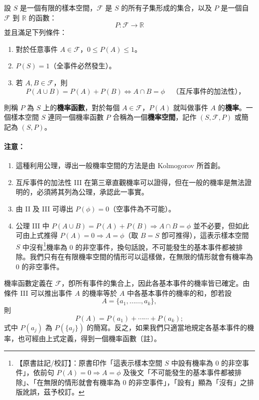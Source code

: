 \medskip
\begin{definition*}
設 $S$ 是一個有限的樣本空間，$\mathscr{F}$ 是 $S$ 的所有子集形成的集合，以及 $P$ 是一個自 $\mathscr{F}$ 到 $\mathbb{R}$ 的函數：
\[
P \colon \mathscr{F} \longrightarrow \mathbb{R}
\]
並且滿足下列條件：
\begin{enumerate}[label=\Roman*., itemsep=2pt, topsep=2pt]
  \item 對於任意事件 $A \in \mathscr{F}$，$0 \le P(A) \le 1$。
  \item $P(S) = 1$（全事件必然發生）。
  \item 若 $A, B \in \mathscr{F}$，則
  \[
  P(A \cup B) = P(A) + P(B) \Longleftrightarrow A \cap B = \phi \quad \text{（互斥事件的加法性），}
  \]
\end{enumerate}
則稱 $P$ 為 $S$ 上的\textbf{機率函數}，對於每個 $A \in \mathscr{F}$，$P(A)$ 就叫做事件 $A$ 的\textbf{機率}。一個樣本空間 $S$ 連同一個機率函數 $P$ 合稱為一個\textbf{機率空間}，記作 $(S, \mathscr{F}, P)$ 或簡記為 $(S, P)$。
\end{definition*}

\medskip
\paragraph{注意：}
\begin{enumerate}[label=\arabic*., leftmargin=2em, itemsep=0.3em]
  \item 這種利用公理，導出一般機率空間的方法是由 Kolmogorov 所首創。
  \item 互斥事件的加法性 III 在第三章直觀機率可以證得，但在一般的機率是無法證明的，必須將其列為公理，承認此一事實。
  \item 由 II 及 III 可導出 $P(\phi) = 0$（空事件為不可能）。
  \item 公理 III 中 $P(A \cup B) = P(A) + P(B) \Longrightarrow A \cap B = \phi$ 並不必要，但如此可由上式推得 $P(A) = 0 \Longrightarrow A = \phi$（取 $B = S$ 卽可推得），這表示樣本空間 $S$ 中沒有\label{note:b5s-ch4-p116-meiyou}\footnote{【原書註記/校訂】：原書印作「這表示樣本空間 $S$ 中設有機率為 0 的非空事件」，依前句 $P(A) = 0 \Longrightarrow A = \phi$ 及後文「不可能發生的基本事件都被排除」、「在無限的情形就會有機率為 0 的非空事件」，「設有」顯為「沒有」之排版訛誤，茲予校訂。}機率為 0 的非空事件，換句話說，不可能發生的基本事件都被排除。我們只有在有限機率空間的情形可以這樣做，在無限的情形就會有機率為 0 的非空事件。
\end{enumerate}

機率函數定義在 $\mathscr{F}$，卽所有事件的集合上，因此各基本事件的機率皆已確定。由條件 III 可以推出事件 $A$ 的機率等於 $A$ 中各基本事件的機率的和，卽若設
\[
A = \{a_1, \dots\dots, a_k\},
\]
則
\[
P(A) = P(a_1) + \cdots\cdots + P(a_k);
\]
式中 $P(a_j)$ 為 $P(\{a_j\})$ 的簡寫。反之，如果我們只適當地規定各基本事件的機率，也可經由上式定義，得到一個機率函數〔註〕。

